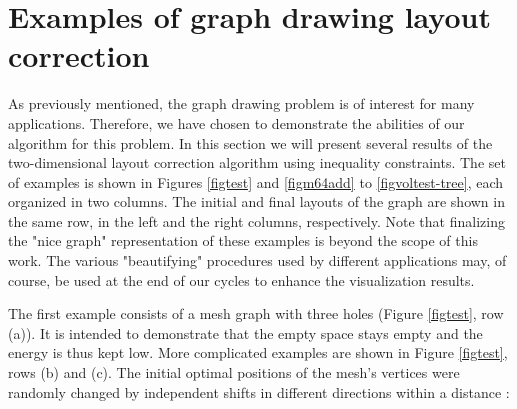 \documentclass[final]{siamltex}
\begin{document}
\section{Examples of graph drawing layout correction}\label{sExamples}
\par As previously mentioned, the graph drawing problem is of interest
for many applications. Therefore, we have chosen to demonstrate
the abilities of our algorithm for this problem. In this section
we will present several results of the two-dimensional layout
correction algorithm using inequality constraints. The set of
examples is shown in Figures \ref{figtest} and \ref{figm64add} to
 \ref{figvoltest-tree}, each organized in two columns. The initial and
 final layouts of the graph are shown in the same row, in the left and
 the right columns, respectively.
Note that finalizing the "nice graph" representation of these
examples is beyond the scope of this work. The various
"beautifying" procedures used by different applications may, of
course, be used at the end of our cycles to enhance the
visualization results.

\par The first example consists
 of a mesh graph with three holes (Figure \ref{figtest}, row (a)).
 It is intended to demonstrate that the empty space stays empty and
 the energy is thus kept low. More complicated examples are shown
 in Figure \ref{figtest}, rows (b) and (c). The initial optimal positions
 of the mesh's vertices were randomly changed by independent shifts
 in different directions within a distance :
\end{document}
